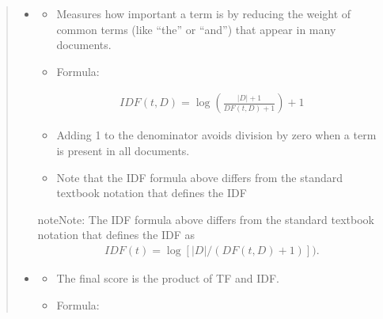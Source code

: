 \documentclass[letterpaper,11pt,english]{sphinxmanual}
\begin{document}
\begin{itemize}
\begin{quote}
\begin{itemize}
\item {} \begin{description}
\begin{itemize}
\item {} 
\sphinxAtStartPar
Measures how important a term is by reducing the weight of common terms (like “the” or “and”) that appear in many documents.

\item {} 
\sphinxAtStartPar
Formula:

\end{itemize}
\begin{equation*}
\begin{split}IDF(t, D) = \log\left(\frac{|D|+1}{DF(t,D) + 1}\right) + 1\end{split}
\end{equation*}\begin{itemize}
\item {} 
\sphinxAtStartPar
Adding 1 to the denominator avoids division by zero when a term is present in all documents.

\item {} 
\sphinxAtStartPar
Note that the IDF formula above differs from the standard textbook notation that defines the IDF

\end{itemize}

\begin{sphinxadmonition}{note}{Note:}
\sphinxAtStartPar
The IDF formula above differs from the standard textbook notation that defines the IDF as
\begin{equation*}
\begin{split}IDF(t) = \log [ |D| / (DF(t,D) + 1) ]).\end{split}
\end{equation*}\end{sphinxadmonition}

\end{description}

\item {} \begin{description}
\begin{itemize}
\item {} 
\sphinxAtStartPar
The final score is the product of TF and IDF.

\item {} 
\sphinxAtStartPar
Formula:


\end{itemize}
\end{description}
\end{itemize}
\end{quote}
\end{itemize}
\end{document}
